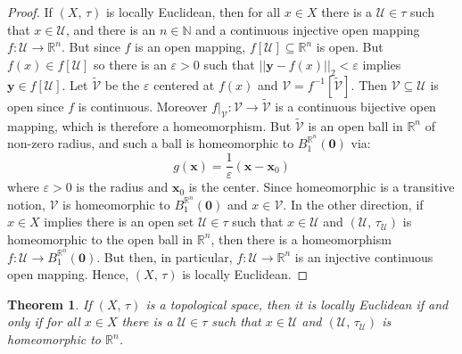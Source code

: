 \documentclass{article}
\theoremstyle{plain}
\newtheorem{theorem}{Theorem}[section]
\theoremstyle{normal}
\begin{document}
        \begin{proof}
            If $(X,\,\tau)$ is locally Euclidean, then for all $x\in{X}$ there
            is a $\mathcal{U}\in\tau$ such that $x\in\mathcal{U}$, and there
            is an $n\in\mathbb{N}$ and a continuous injective open mapping
            $f:\mathcal{U}\rightarrow\mathbb{R}^{n}$. But since $f$ is an
            open mapping, $f[\mathcal{U}]\subseteq\mathbb{R}^{n}$ is open.
            But $f(x)\in{f}[\mathcal{U}]$ so there is an $\varepsilon>0$ such
            that $||\mathbf{y}-f(x)||_{2}<\varepsilon$ implies
            $\mathbf{y}\in{f}[\mathcal{U}]$. Let $\tilde{\mathcal{V}}$ be the
            $\varepsilon$ centered at $f(x)$ and
            $\mathcal{V}=f^{-1}[\tilde{\mathcal{V}}]$. Then
            $\mathcal{V}\subseteq\mathcal{U}$ is open since $f$ is continuous.
            Moreover
            $f|_{\mathcal{V}}:\mathcal{V}\rightarrow\tilde{\mathcal{V}}$ is
            a continuous bijective open mapping, which is therefore a
            homeomorphism. But $\tilde{\mathcal{V}}$ is an open ball in
            $\mathbb{R}^{n}$ of non-zero radius, and such a ball is homeomorphic
            to $B_{1}^{\mathbb{R}^{n}}(\mathbf{0})$ via:
            \begin{equation}
                g(\mathbf{x})=\frac{1}{\varepsilon}(\mathbf{x}-\mathbf{x}_{0})
            \end{equation}
            where $\varepsilon>0$ is the radius and $\mathbf{x}_{0}$ is the
            center. Since homeomorphic is a transitive notion,
            $\mathcal{V}$ is homeomorphic to
            $B_{1}^{\mathbb{R}^{n}}(\mathbf{0})$ and $x\in\mathcal{V}$. In the
            other direction, if $x\in{X}$ implies there is an open set
            $\mathcal{U}\in\tau$ such that $x\in\mathcal{U}$ and
            $(\mathcal{U},\,\tau_{\mathcal{U}})$ is homeomorphic to the open
            ball in $\mathbb{R}^{n}$, then there is a homeomorphism
            $f:\mathcal{U}\rightarrow{B}_{1}^{\mathbb{R}^{n}}(\mathbf{0})$. But
            then, in particular, $f:\mathcal{U}\rightarrow\mathbb{R}^{n}$ is an
            injective continuous open mapping. Hence, $(X,\,\tau)$ is locally
            Euclidean.
        \end{proof}
        \begin{theorem}
            If $(X,\,\tau)$ is a topological space, then it is locally
            Euclidean if and only if for all $x\in{X}$ there is a
            $\mathcal{U}\in\tau$ such that $x\in\mathcal{U}$ and
            $(\mathcal{U},\,\tau_{\mathcal{U}})$ is homeomorphic to
            $\mathbb{R}^{n}$.
        \end{theorem}
\end{document}
